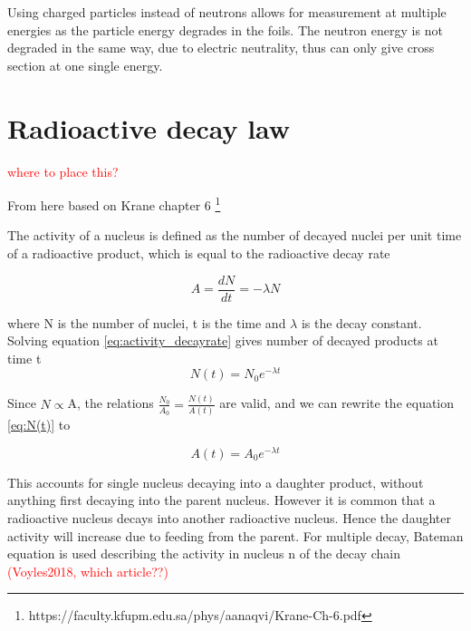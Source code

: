 Using charged particles instead of neutrons allows for measurement at multiple energies as the particle energy degrades in the foils. The neutron energy is not degraded in the same way, due to electric neutrality, thus can only give cross section at one single energy. 


\section{Radioactive decay law}
\textcolor{red}{where to place this? }

From here based on Krane chapter 6 \footnote{https://faculty.kfupm.edu.sa/phys/aanaqvi/Krane-Ch-6.pdf}

The activity of a nucleus is defined as the number of decayed nuclei per unit time of a radioactive product, which is equal to the radioactive decay rate 

\begin{equation} \label{eq:activity_decayrate}
   A =  \frac{dN}{dt}=-\lambda N
\end{equation}

where N is the number of nuclei, t is the time and $\lambda$ is the decay constant. Solving equation \ref{eq:activity_decayrate} gives number of decayed products at time t
\begin{equation} \label{eq:N(t)}
    N(t) = N_0 e^{-\lambda t}
\end{equation}

\noindent 
Since $N\propto$A, the relations $\frac{N_0}{A_0}=\frac{N(t)}{A(t)}$ are valid, and we can rewrite the equation \ref{eq:N(t)} to

\begin{equation} \label{eq:activity_decaylaw}
    A(t) = A_0 e^{-\lambda t}
\end{equation}


This accounts for single nucleus decaying into a daughter product, without anything first decaying into the parent nucleus. However it is common that a radioactive nucleus decays into another radioactive nucleus. Hence the daughter activity will increase due to feeding from the parent.
For multiple decay, Bateman equation is used describing the activity in nucleus n of the decay chain \textcolor{red}{(Voyles2018, which article??)}

